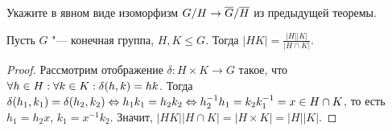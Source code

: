 \begin{exercise}
	Укажите в явном виде изоморфизм $G / H \hm\to \ol{G} / \ol{H}$ из предыдущей теоремы.
\end{exercise}

\begin{proposition}
	Пусть $G$ "--- конечная группа, $H, K \le G$. Тогда $|HK| = \frac{|H||K|}{|H\cap K|}$.
\end{proposition}

\begin{proof}
	Рассмотрим отображение $\delta: H\times K \to G$ такое, что $\forall h \hm\in H: \forall k \in K: \delta(h, k) = hk$. Тогда $\delta(h_1, k_1) = \delta(h_2, k_2) \hm\Leftrightarrow h_1k_1 = h_2k_2 \hm\Leftrightarrow h_2^{-1}h_1 = k_2k_1^{-1} = x \in H \cap K$, то есть $h_1 = h_2x$, $k_1 = x^{-1}k_2$. Значит, $|HK||H \cap K| = |H \times K| = |H||K|$.
\end{proof}